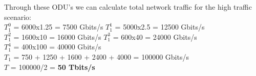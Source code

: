 \vspace{17pt}
Through these ODU's we can calculate total network traffic for the high traffic scenario:\\

$T_1^0$ = 6000x1.25 = 7500 Gbits/s \qquad
$T_1^1$ = 5000x2.5 = 12500 Gbits/s \\

$T_1^2$ = 1600x10 = 16000 Gbits/s \qquad
$T_1^3$ = 600x40 = 24000 Gbits/s \\

$T_1^4$ = 400x100 = 40000 Gbits/s \\

$T_{1}$ = 750 + 1250 + 1600 + 2400 + 4000 = 100000 Gbits/s \\

$T$ = 100000/2 = \textbf{50 Tbits/s}\\

